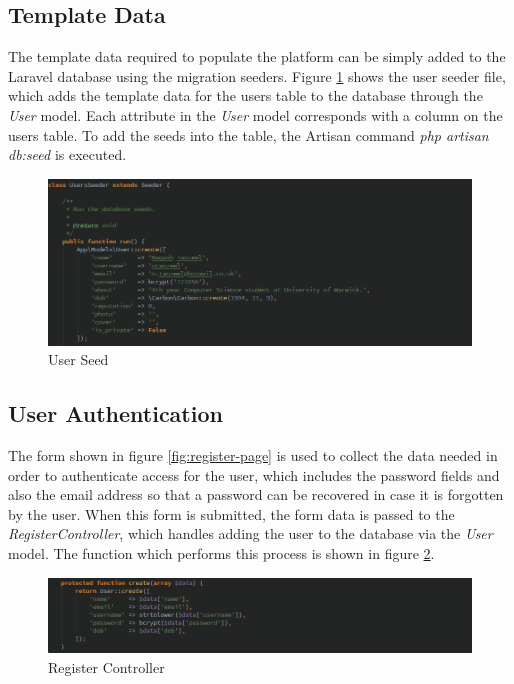\subsection{Template Data}
The template data required to populate the platform can be simply added to the Laravel database using the migration seeders. Figure \ref{fig:seed} shows the user seeder file, which adds the template data for the users table to the database through the \emph{User} model. Each attribute in the \emph{User} model corresponds with a column on the users table. To add the seeds into the table, the Artisan command \textit{php artisan db:seed} is executed.

\begin{figure}[H]
	\centering
	\includegraphics[width=\textwidth]{Images/Implementation/seed}
	\caption{User Seed} \label{fig:seed}
\end{figure}

\subsection{User Authentication}
The form shown in figure \ref{fig:register-page} is used to collect the data needed in order to authenticate access for the user, which includes the password fields and also the email address so that a password can be recovered in case it is forgotten by the user. When this form is submitted, the form data is passed to the \emph{RegisterController}, which handles adding the user to the database via the \emph{User} model. The function which performs this process is shown in figure \ref{fig:register-controller}.

\begin{figure}[H]
	\centering
	\includegraphics[width=\textwidth]{Images/Implementation/register-controller}
	\caption{Register Controller} \label{fig:register-controller}
\end{figure}